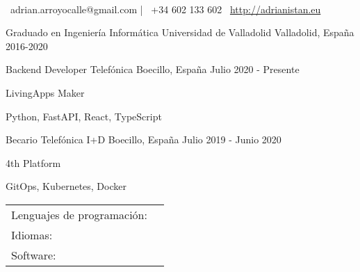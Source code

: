 \documentclass[]{awesome-cv}
\begin{document}
\begin{minipage}[b]{0.66666\textwidth}
\begin{center}
	  \\
	\vspace{2mm}
	{\faEnvelope\ adrian.arroyocalle@gmail.com} | {\faMobile\ +34 602 133 602}  {\faLink\ \url{http://adrianistan.eu}}
\end{center}
\end{minipage}

\begin{cventries}
	\cventry
	{Graduado en Ingeniería Informática}
	{Universidad de Valladolid}
	{Valladolid, España}
	{2016-2020}
	{}
\end{cventries}

\vspace{-2mm}
\begin{cventries}
	\cventry
	{Backend Developer}
	{Telefónica}
	{Boecillo, España}
	{Julio 2020 - Presente}
	{\begin{cvitems}
		\item {LivingApps Maker}
		\item {Python, FastAPI, React, TypeScript}
	\end{cvitems}}
	\cventry
	{Becario}
	{Telefónica I+D}
	{Boecillo, España}
	{Julio 2019 - Junio 2020}
	{\begin{cvitems}
		\item {4th Platform}
		\item {GitOps, Kubernetes, Docker}
	\end{cvitems}
	}
\end{cventries}
\begin{cventries}
	\cventry
	{}
	{\def\arraystretch{1.15}{\begin{tabular}{ l l }
		Lenguajes de programación:  & {\skill{ Rust, C, Python, Java, JavaScript, SQL, Prolog}} \\
		Idiomas:  & {\skill{ Español (nativo), Inglés ( FIRST B2)}} \\
		Software: & {\skill{Linux, Kubernetes, Docker, Azure, AWS, \LaTeX , PostgreSQL, Microsoft Office, Git}} \\
		\end{tabular}}}
	{}
	{}
	{}
\end{cventries}
\end{document}
